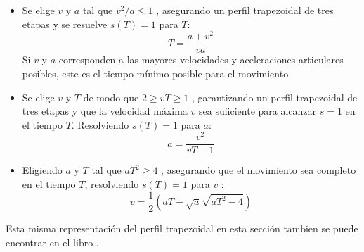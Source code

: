     \begin{itemize}
        \item Se elige $v$ y $a$  tal que $v^2/a \leq 1$ , asegurando un perfil trapezoidal de tres etapas y se resuelve $s(T)=1$ para $T$:
        \begin{equation}
            T=\frac{a + v^2}{va}
            \label{eq:cap4_tray_39}
        \end{equation}
        Si $v$ y $a$  corresponden a las mayores velocidades y aceleraciones articulares posibles, este es el tiempo mínimo posible para el movimiento.
        
        \item 	Se elige $v$ y $T$ de modo que $2 \geq vT \geq 1$ , garantizando un perfil trapezoidal de tres etapas y que la velocidad máxima $v$ sea suficiente para alcanzar $s = 1$ en el tiempo $T$. Resolviendo $s(T)=1$   para $a$:
        \begin{equation}
            a=\frac{v^2}{vT-1}
            \label{eq:cap4_tray_40}
        \end{equation}
        
        \item 	Eligiendo $a$ y $T$ tal que $aT^2 \geq 4$ , asegurando que el movimiento sea completo en el tiempo $T$, resolviendo  $s(T)=1$  para $v$ : 
        \begin{equation}
            v=\frac{1}{2}(aT-\sqrt{a}\sqrt{aT^2 - 4})
            \label{eq:cap4_tray_41}
        \end{equation}
    \end{itemize}
        
    Esta misma representación del perfil trapezoidal en esta sección tambien se puede encontrar en el libro \cite{tray_trape}.
        
        
                \newpage
